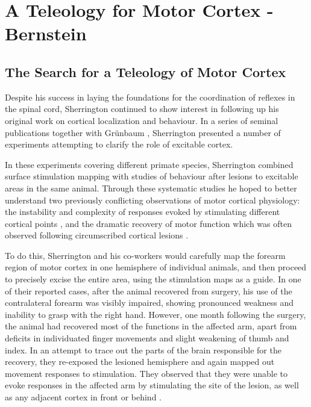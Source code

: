 \section{A Teleology for Motor Cortex - Bernstein}

\subsection{The Search for a Teleology of Motor Cortex}

Despite his success in laying the foundations for the coordination of reflexes in the spinal cord, Sherrington continued to show interest in following up his original work on cortical localization and behaviour. In a series of seminal publications together with Gr\"unbaum \cite{Grunbaum1903,Leyton1917}, Sherrington presented a number of experiments attempting to clarify the role of excitable cortex.

In these experiments covering different primate species, Sherrington combined surface stimulation mapping with studies of behaviour after lesions to excitable areas in the same animal. Through these systematic studies he hoped to better understand two previously conflicting observations of motor cortical physiology: the instability and complexity of responses evoked by stimulating different cortical points \cite{GrahamBrown1912}, and the dramatic recovery of motor function which was often observed following circumscribed cortical lesions \cite{GrahamBrown1913}.

To do this, Sherrington and his co-workers would carefully map the forearm region of motor cortex in one hemisphere of individual animals, and then proceed to precisely excise the entire area, using the stimulation maps as a guide. In one of their reported cases, after the animal recovered from surgery, his use of the contralateral forearm was visibly impaired, showing pronounced weakness and inability to grasp with the right hand. However, one month following the surgery, the animal had recovered most of the functions in the affected arm, apart from deficits in individuated finger movements and slight weakening of thumb and index. In an attempt to trace out the parts of the brain responsible for the recovery, they re-exposed the lesioned hemisphere and again mapped out movement responses to stimulation. They observed that they were unable to evoke responses in the affected arm by stimulating the site of the lesion, as well as any adjacent cortex in front or behind \cite{Leyton1917}.

